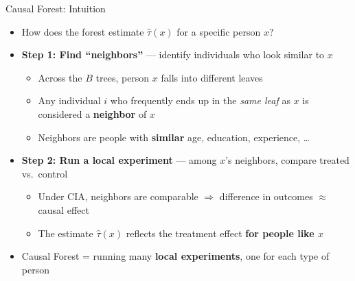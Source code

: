 \documentclass[hyperref={pdfpagelabels=false}]{beamer}
\begin{document}
\begin{frame}{Causal Forest: Intuition}
	\begin{itemize}
		\item How does the forest estimate $\hat{\tau}(x)$ for a specific person $x$?
		\vspace{0.3cm}
		\item \textbf{Step 1: Find ``neighbors''} --- identify individuals who look similar to $x$
		\vspace{0.15cm}
		\begin{itemize}
			\item Across the $B$ trees, person $x$ falls into different leaves
			\vspace{0.1cm}
			\item Any individual $i$ who frequently ends up in the \textit{same leaf} as $x$ is considered a \textbf{neighbor} of $x$
			\vspace{0.1cm}
			\item Neighbors are people with \textbf{similar} age, education, experience, \ldots
		\end{itemize}
		\vspace{0.3cm}
		\item \textbf{Step 2: Run a local experiment} --- among $x$'s neighbors, compare treated vs.\ control
		\vspace{0.15cm}
		\begin{itemize}
			\item Under CIA, neighbors are comparable $\Rightarrow$ difference in outcomes $\approx$ causal effect
			\vspace{0.1cm}
			\item The estimate $\hat{\tau}(x)$ reflects the treatment effect \textbf{for people like $x$}
		\end{itemize}
		\vspace{0.3cm}
		\item[$\Rightarrow$] Causal Forest = running many \textbf{local experiments}, one for each type of person
	\end{itemize}
\end{frame}
\end{document}

